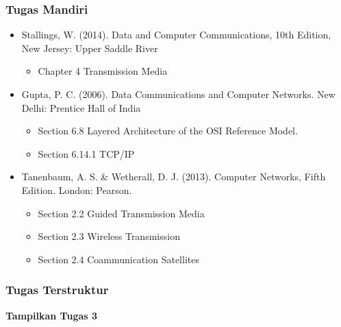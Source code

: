 \documentclass[pdflatex,compress]{beamer}
\begin{document}
\begin{frame}
	\frametitle{Tugas Mandiri}
	\begin{itemize}
		\item Stallings, W. (2014). Data and Computer Communications, 10th Edition, New Jersey: Upper Saddle River\\
		\begin{itemize}
			\item Chapter 4 Transmission Media
		\end{itemize}
		\item Gupta, P. C. (2006). Data Communications and Computer Networks. New Delhi: Prentice Hall of India\\
		\begin{itemize}
			\item Section 6.8 Layered Architecture of the OSI Reference Model.
			\item Section 6.14.1 TCP/IP
		\end{itemize}
		\item Tanenbaum, A. S. \& Wetherall, D. J. (2013). Computer Networks, Fifth Edition. London: Pearson.\\
		\begin{itemize}
			\item Section 2.2 Guided Transmission Media
			\item Section 2.3 Wireless Transmission
			\item Section 2.4 Coammunication Satellites
		\end{itemize}
	\end{itemize}
\end{frame}

\begin{frame}
	\frametitle{Tugas Terstruktur}
	\textbf{Tampilkan Tugas 3}
\end{frame}
\end{document}
